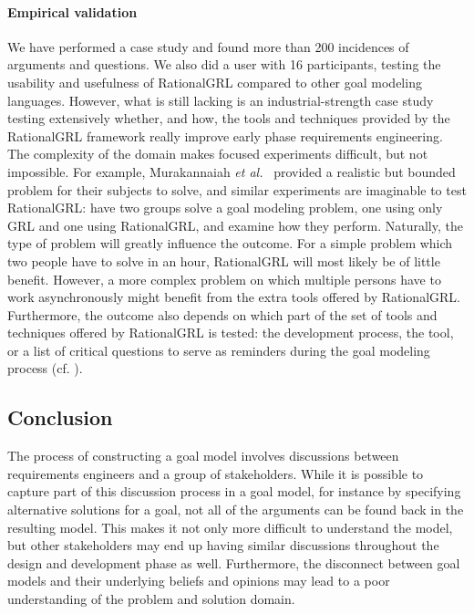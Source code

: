 \paragraph{Empirical validation}
We have performed a case study and found more than 200 incidences of arguments and questions. We also did a user with 16 participants, testing the usability and usefulness of RationalGRL compared to other goal modeling languages. However, what is still lacking is an industrial-strength case study testing extensively whether, and how, the tools and techniques provided by the RationalGRL framework really improve early phase requirements engineering. The complexity of the domain makes focused experiments difficult, but not impossible. For example, Murakannaiah \emph{et al.}~\cite{murukannaiah2015} provided a realistic but bounded problem for their subjects to solve, and similar experiments are imaginable to test RationalGRL: have two groups solve a goal modeling problem, one using only GRL and one using RationalGRL, and examine how they perform. Naturally, the type of problem will greatly influence the outcome. For a simple problem which two people have to solve in an hour, RationalGRL will most likely be of little benefit. However, a more complex problem on which multiple persons have to work asynchronously might benefit from the extra tools offered by RationalGRL. Furthermore, the outcome also depends on which part of the set of tools and techniques offered by RationalGRL is tested: the development process, the tool, or a list of critical questions to serve as reminders during the goal modeling process (cf. \cite{SchriekEtal2016}).

\subsection{Conclusion}
\label{sect:discussion:conclusion}

The process of constructing a goal model involves discussions between requirements engineers and a group of stakeholders. While it is possible to capture part of this discussion process in a goal model, for instance by specifying alternative solutions for a goal, not all of the arguments can be found back in the resulting model. This makes it not only more difficult to understand the model, but other stakeholders may end up having similar discussions throughout the design and development phase as well. Furthermore, the disconnect between goal models and their underlying beliefs and opinions may lead to a poor understanding of the problem and solution domain. 

